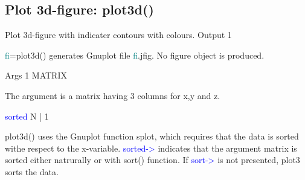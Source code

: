 \subsection{Plot 3d-figure: \textcolor{VioletRed}{plot3d}()}
\label{plot3d}
Plot 3d-figure with indicater contours  with colours.
\vspace{0.3cm}
\hline
\vspace{0.3cm}
\noindent Output  \tabto{3cm}  1   \tabto{5cm}    \tabto{7cm}
\begin{changemargin}{3cm}{0cm}
\noindent  \textcolor{teal}{fi}=\textcolor{VioletRed}{plot3d}() generates Gnuplot file \textcolor{teal}{fi}.jfig.
No figure object is produced.
\end{changemargin}
\vspace{0.3cm}
\hline
\vspace{0.3cm}
\noindent Args \tabto{3cm}  1  \tabto{5cm}   MATRIX  \tabto{7cm}
\begin{changemargin}{3cm}{0cm}
\noindent  The argument is a matrix having 3 columns for x,y and z.
\end{changemargin}
\vspace{0.3cm}
\hline
\vspace{0.3cm}
\noindent \textcolor{blue}{sorted}  \tabto{3cm}  N | 1  \tabto{5cm}    \tabto{7cm}
\begin{changemargin}{3cm}{0cm}
\noindent \textcolor{VioletRed}{plot3d}() uses the Gnuplot function splot, which requires that the data
is sorted withe respect to the x-variable. \textcolor{blue}{sorted->} indicates that the argument matrix is sorted
either natrurally or with \textcolor{VioletRed}{sort}() function. If \textcolor{blue}{sort->} is not presented, plot3
sorts the data.
\end {changemargin}
\hline
\vspace{0.2cm}

